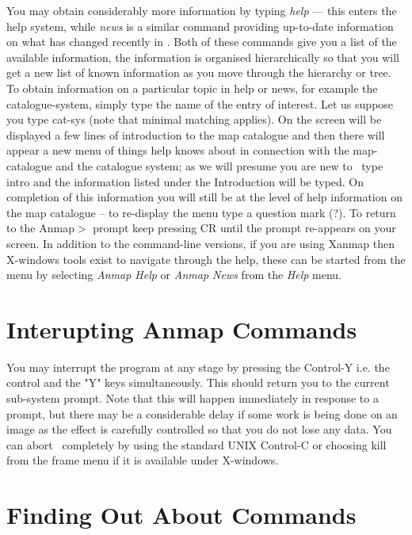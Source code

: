 You may obtain considerably more information by typing {\em help} ---
this enters the help system, while {\em news} is a similar command
providing up-to-date information on what has changed recently in
\Anmap.  Both of these commands give you a list of the available
information, the information is organised hierarchically so that
you will get a new list of known information as you move through
the hierarchy or tree.
To obtain information on a
particular topic in help or news, for example the catalogue-system, 
simply type the name of the entry of interest. Let us suppose you type
cat-sys (note that minimal matching applies). On the screen
will be displayed a few lines of introduction to the map
catalogue and then there will appear a new menu of things help
knows about in connection with the map-catalogue and the
catalogue system; as we will
presume you are new to \Anmap\, type intro and the information
listed under the Introduction will be typed. On completion of
this information you will still be at the level of help
information on the map catalogue -- to re-display the menu
type a question mark (?). 
To return to the Anmap$>$ prompt keep pressing CR until
the prompt re-appears on your screen.
In addition to the command-line versions, if you are using Xanmap
then X-windows tools exist to navigate through the help, these
can be started from the menu by selecting {\em Anmap Help}
or {\em Anmap News} from the {\em Help} menu.
 
 
\section{Interupting Anmap Commands}
 
You may interrupt the program at any stage by pressing the 
Control-Y i.e. the control and the "Y" keys simultaneously.
This should return you to the current sub-system prompt.
Note that this will happen immediately in response to a
prompt, but there may be a considerable delay if some work is
being done on an image as the effect is carefully controlled
so that you do not lose any data.  You can abort \Anmap\
completely by using the standard UNIX Control-C or choosing 
kill from the frame menu if it is available under X-windows.



\section{Finding Out About Commands}

